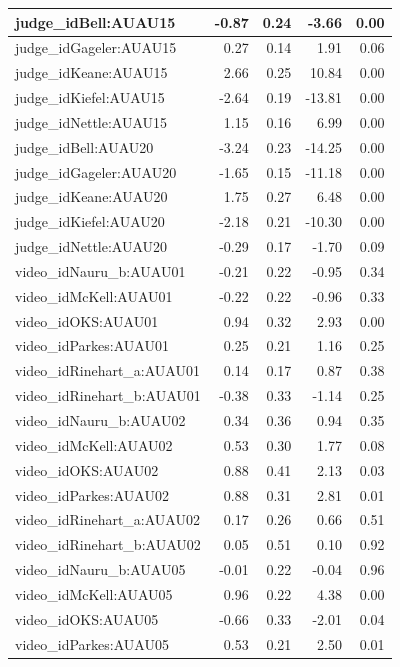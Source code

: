 \documentclass{monashthesis}
\begin{document}
\begin{tabular}{l|r|r|r|r}
judge\_idBell:AUAU15 & -0.87 & 0.24 & -3.66 & 0.00\\
\hline
judge\_idGageler:AUAU15 & 0.27 & 0.14 & 1.91 & 0.06\\
\hline
judge\_idKeane:AUAU15 & 2.66 & 0.25 & 10.84 & 0.00\\
\hline
judge\_idKiefel:AUAU15 & -2.64 & 0.19 & -13.81 & 0.00\\
\hline
judge\_idNettle:AUAU15 & 1.15 & 0.16 & 6.99 & 0.00\\
\hline
judge\_idBell:AUAU20 & -3.24 & 0.23 & -14.25 & 0.00\\
\hline
judge\_idGageler:AUAU20 & -1.65 & 0.15 & -11.18 & 0.00\\
\hline
judge\_idKeane:AUAU20 & 1.75 & 0.27 & 6.48 & 0.00\\
\hline
judge\_idKiefel:AUAU20 & -2.18 & 0.21 & -10.30 & 0.00\\
\hline
judge\_idNettle:AUAU20 & -0.29 & 0.17 & -1.70 & 0.09\\
\hline
video\_idNauru\_b:AUAU01 & -0.21 & 0.22 & -0.95 & 0.34\\
\hline
video\_idMcKell:AUAU01 & -0.22 & 0.22 & -0.96 & 0.33\\
\hline
video\_idOKS:AUAU01 & 0.94 & 0.32 & 2.93 & 0.00\\
\hline
video\_idParkes:AUAU01 & 0.25 & 0.21 & 1.16 & 0.25\\
\hline
video\_idRinehart\_a:AUAU01 & 0.14 & 0.17 & 0.87 & 0.38\\
\hline
video\_idRinehart\_b:AUAU01 & -0.38 & 0.33 & -1.14 & 0.25\\
\hline
video\_idNauru\_b:AUAU02 & 0.34 & 0.36 & 0.94 & 0.35\\
\hline
video\_idMcKell:AUAU02 & 0.53 & 0.30 & 1.77 & 0.08\\
\hline
video\_idOKS:AUAU02 & 0.88 & 0.41 & 2.13 & 0.03\\
\hline
video\_idParkes:AUAU02 & 0.88 & 0.31 & 2.81 & 0.01\\
\hline
video\_idRinehart\_a:AUAU02 & 0.17 & 0.26 & 0.66 & 0.51\\
\hline
video\_idRinehart\_b:AUAU02 & 0.05 & 0.51 & 0.10 & 0.92\\
\hline
video\_idNauru\_b:AUAU05 & -0.01 & 0.22 & -0.04 & 0.96\\
\hline
video\_idMcKell:AUAU05 & 0.96 & 0.22 & 4.38 & 0.00\\
\hline
video\_idOKS:AUAU05 & -0.66 & 0.33 & -2.01 & 0.04\\
\hline
video\_idParkes:AUAU05 & 0.53 & 0.21 & 2.50 & 0.01\\

\end{tabular}
\end{document}
